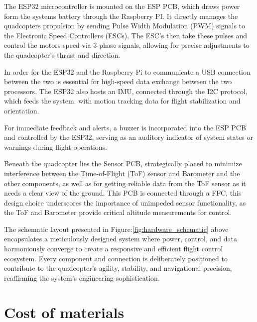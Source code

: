\documentclass{report}
\begin{document}
The ESP32 microcontroller is mounted on the ESP PCB, which draws power form the
systems battery through the Raspberry PI. It directly manages the quadcopters
propulsion by sending Pulse Width Modulation (PWM) signals to the Electronic
Speed Controllers (ESCs). The ESC’s then take these pulses and control the
motors speed via 3-phase signals, allowing for precise adjustments to the
quadcopter's thrust and direction.

In order for the ESP32 and the Raspberry Pi to communicate a USB connection
between the two is essential for high-speed data exchange between the two
processors. The ESP32 also hosts an IMU, connected through the I2C protocol,
which feeds the system. with motion tracking data for flight stabilization and
orientation.

For immediate feedback and alerts, a buzzer is incorporated into the ESP PCB and
controlled by the ESP32, serving as an auditory indicator of system states or
warnings during flight operations.

Beneath the quadcopter lies the Sensor PCB, strategically placed to minimize
interference between the Time-of-Flight (ToF) sensor and Barometer and the other
components, as well as for getting reliable data from the ToF sensor as it needs
a clear view of the ground. This PCB is connected through a FFC, this design
choice underscores the importance of unimpeded sensor functionality, as the ToF
and Barometer provide critical altitude measurements for control.

The schematic layout presented in Figure:\ref{fig:hardware_schematic}  above
encapsulates a meticulously designed system where power, control, and data
harmoniously converge to create a responsive and efficient flight control
ecosystem. Every component and connection is deliberately positioned to
contribute to the quadcopter’s agility, stability, and navigational precision,
reaffirming the system’s engineering sophistication.

\section{Cost of materials}
\end{document}
